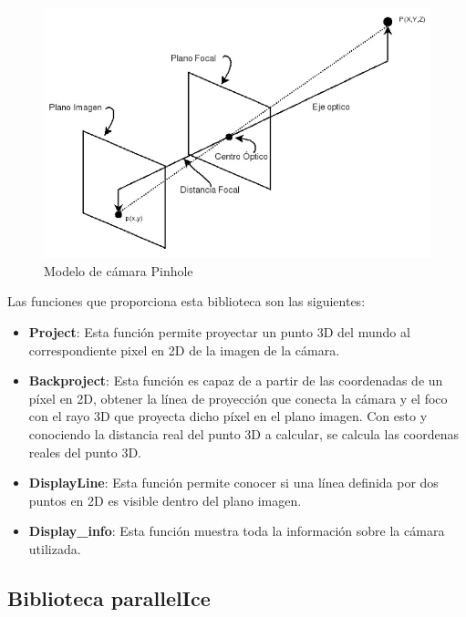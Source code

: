 \begin{figure}[th]
\centering
\includegraphics[scale=0.5]{Figures/pinhole-model.jpg}
\decoRule
\caption[pinhole]{Modelo de cámara Pinhole}
\label{fig:Pinhole}
\end{figure}

Las funciones que proporciona esta biblioteca son las siguientes:

\begin{itemize}
\item \textbf{Project}: Esta función permite proyectar un punto 3D del mundo al correspondiente pixel en 2D de la imagen de la cámara. 

\item \textbf{Backproject}: Esta función es capaz de a partir de las coordenadas de un píxel en 2D, obtener la línea de proyección que conecta la cámara y el foco con el rayo 3D que proyecta dicho píxel en el plano imagen. Con esto y conociendo la distancia real del punto 3D a calcular, se calcula las coordenas reales del punto 3D.

\item \textbf{DisplayLine}: Esta función permite conocer si una línea definida por dos puntos en 2D es visible dentro del plano imagen. 

\item \textbf{Display\_info}: Esta función muestra toda la información sobre la cámara utilizada.

\end{itemize}

\subsection{Biblioteca parallelIce}

